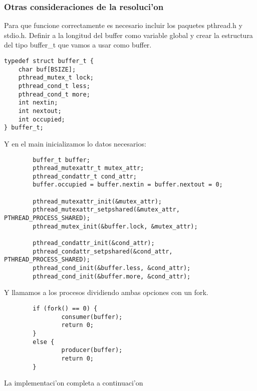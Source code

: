 \subsubsection{Otras consideraciones de la resoluci'on}
Para que funcione correctamente es necesario incluir los paquetes pthread.h y stdio.h. Definir a la longitud del buffer como variable global y crear la estructura del tipo buffer\_t que vamos a usar como buffer.
\begin{mylisting}
\begin{verbatim}
typedef struct buffer_t {
	char buf[BSIZE];
	pthread_mutex_t lock;
	pthread_cond_t less;
	pthread_cond_t more;
	int nextin;
	int nextout;
	int occupied;
} buffer_t;
\end{verbatim}
\end{mylisting}
Y en el main inicializamos lo datos necesarios:
\begin{mylisting}
\begin{verbatim}
        buffer_t buffer;
        pthread_mutexattr_t mutex_attr;
        pthread_condattr_t cond_attr;
        buffer.occupied = buffer.nextin = buffer.nextout = 0;
        
        pthread_mutexattr_init(&mutex_attr);
        pthread_mutexattr_setpshared(&mutex_attr, PTHREAD_PROCESS_SHARED);
        pthread_mutex_init(&buffer.lock, &mutex_attr);
        
        pthread_condattr_init(&cond_attr);
        pthread_condattr_setpshared(&cond_attr, PTHREAD_PROCESS_SHARED);
        pthread_cond_init(&buffer.less, &cond_attr);
        pthread_cond_init(&buffer.more, &cond_attr);
\end{verbatim}
\end{mylisting}
Y llamamos a los procesos dividiendo ambas opciones con un fork.
\begin{mylisting}
\begin{verbatim}
        if (fork() == 0) {
                consumer(buffer);
                return 0;
        }
        else {
                producer(buffer);
                return 0;
        }
\end{verbatim}
\end{mylisting}
La implementaci'on completa a continuaci'on

